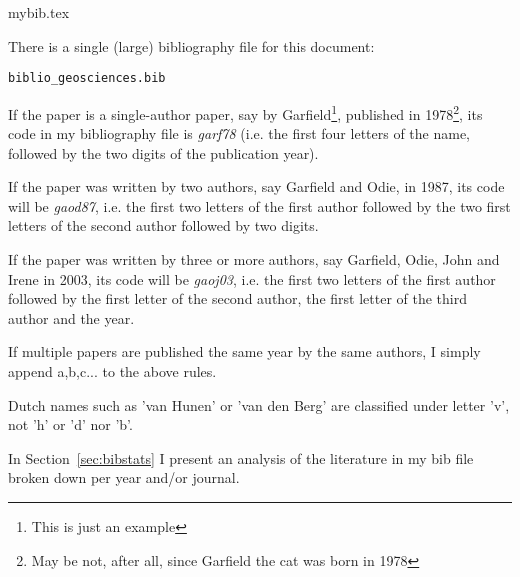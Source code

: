 \begin{flushright} {\tiny {\color{gray} mybib.tex}} \end{flushright}

There is a single (large) bibliography file for this document:
\begin{center}
{\tt biblio\_geosciences.bib}
\end{center}

If the paper is a single-author paper, say by Garfield\footnote{This is just an example}, 
published in 1978\footnote{May be not, after all, since Garfield the cat was born in 1978}, its code 
in my bibliography file is {\sl garf78} (i.e. the first four letters of the name, followed by 
the two digits of the publication year).

If the paper was written by two authors, say Garfield and Odie, in 1987, its code 
will be {\sl gaod87}, i.e. the first two letters of the first author followed by the two 
first letters of the second author followed by two digits.

If the paper was written by three or more authors, say Garfield, Odie, John and Irene in 
2003, its code will be {\sl gaoj03}, i.e. the first two letters of the first author followed 
by the first letter of the second author, the first letter of the third author and the year.

If multiple papers are published the same year by the same authors, I simply append a,b,c... to the 
above rules. 

\begin{remark} Dutch names such as 'van Hunen' or 'van den Berg' are classified under letter 'v', 
not 'h' or 'd' nor 'b'. 
\end{remark}

In Section~\ref{sec:bibstats} I present an analysis of the literature in my bib file
broken down per year and/or journal. 



